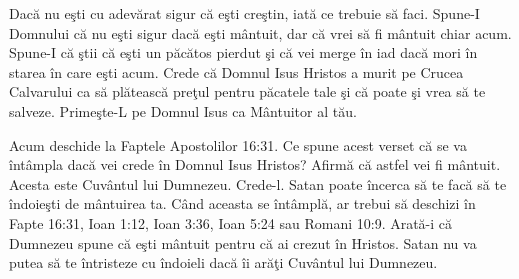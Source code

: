 Dacă nu eşti cu adevărat sigur că eşti creştin, iată ce trebuie să faci. Spune-I Domnului că nu eşti sigur dacă eşti mântuit, dar că vrei să fi mântuit chiar acum. Spune-I că ştii că eşti un păcătos pierdut şi că vei merge în iad dacă mori în starea în care eşti acum. Crede că Domnul Isus Hristos a murit pe Crucea Calvarului ca să plătească preţul pentru păcatele tale şi că poate şi vrea să te salveze. Primeşte-L pe Domnul Isus ca Mântuitor al tău.

Acum deschide la Faptele Apostolilor 16:31. Ce spune acest verset că se va întâmpla dacă vei crede în Domnul Isus Hristos? Afirmă că astfel vei fi mântuit. Acesta este Cuvântul lui Dumnezeu. Crede-l. Satan poate încerca să te facă să te îndoieşti de mântuirea ta. Când aceasta se întâmplă, ar trebui să deschizi în Fapte 16:31, Ioan 1:12, Ioan 3:36, Ioan 5:24 sau Romani 10:9. Arată-i că Dumnezeu spune că eşti mântuit pentru că ai crezut în Hristos. Satan nu va putea să te întristeze cu îndoieli dacă îi arăţi Cuvântul lui Dumnezeu.
